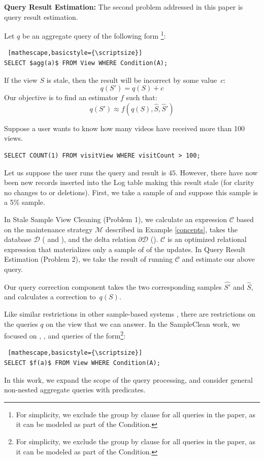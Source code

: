 \noindent\textbf{Query Result Estimation: }
The second problem addressed in this paper is query result estimation.
\begin{problem}
Let $q$ be an aggregate query of the following form \footnote{\scriptsize For simplicity, we exclude the group by clause for all queries in the paper, as it can be modeled as part of the \textsf{Condition}.}:
\begin{lstlisting} [mathescape,basicstyle={\scriptsize}]
SELECT $agg(a)$ FROM View WHERE Condition(A);
\end{lstlisting}
If the view $S$ is stale, then the result will be incorrect by some value~$c$:
\[
q(S') = q(S) + c
\]
Our objective is to find an estimator $f$ such that:
\[
q(S') \approx f(q(S),\widehat{S},\widehat{S}')
\] 
\end{problem}

\begin{example}\label{infexample}
Suppose a user wants to know how many videos have received more than 100 views.
\begin{lstlisting}[basicstyle={\scriptsize}]
SELECT COUNT(1) FROM visitView WHERE visitCount > 100;
\end{lstlisting}
Let us suppose the user runs the query and result is $45$.
However, there have now been new records inserted into the Log table making this result stale (for clarity no changes to  or deletions).
First, we take a sample of  and suppose this sample is a 5\% sample.

In Stale Sample View Cleaning (Problem 1), we calculate an expression $\mathcal{C}$ based on the maintenance strategy $\mathcal{M}$ described in Example \ref{concepts},
takes the database $\mathcal{D}$ ( and ), and the delta relation $\partial \mathcal{D}$ ().
$\mathcal{C}$ is an optimized relational expression that materializes only a sample of of the updates.
In Query Result Estimation (Problem 2), we take the result of running $\mathcal{C}$ and estimate our above query.
\end{example}

\iffalse
Our query correction component takes the two corresponding samples $\widehat{S'}$ and $\widehat{S}$, and calculates a correction to~$q(S)$.

Like similar restrictions in other sample-based systems \cite{agarwalknowing}, there are restrictions on the queries $q$ on the view that we can answer. 
In the SampleClean work, we focused on \sumfunc, \countfunc, and \avgfunc queries of the form\footnote{\scriptsize For simplicity, we exclude the group by clause for all queries in the paper, as it can be modeled as part of the \textsf{Condition}.}: 
\begin{lstlisting} [mathescape,basicstyle={\scriptsize}]
SELECT $f(a)$ FROM View WHERE Condition(A);
\end{lstlisting}
In this work, we expand the scope of the query processing, and consider general non-nested aggregate queries with predicates.

